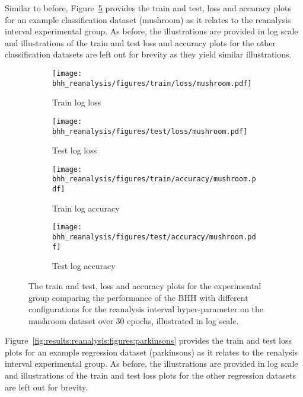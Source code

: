 Similar to before, Figure~\ref{fig:results:reanalysis:figures:mushroom} provides the train and test, loss and accuracy plots for an example classification dataset (mushroom) as it relates to the reanalysis interval experimental group. As before, the illustrations are provided in log scale and illustrations of the train and test loss and accuracy plots for the other classification datasets are left out for brevity as they yield similar illustrations.

\begin{figure}[htbp]
      \begin{subfigure}{0.5\textwidth}
            \centering
            \texttt{[image: bhh\_reanalysis/figures/train/loss/mushroom.pdf]}
            \caption{Train log loss}
            \label{fig:results:reanalysis:figures:loss:train:mushroom}
      \end{subfigure}
      \begin{subfigure}{0.5\textwidth}
            \centering
            \texttt{[image: bhh\_reanalysis/figures/test/loss/mushroom.pdf]}
            \caption{Test log loss}
            \label{fig:results:reanalysis:figures:loss:test:mushroom}
      \end{subfigure}
      \par\bigskip
      \begin{subfigure}{0.5\textwidth}
            \centering
            \texttt{[image: bhh\_reanalysis/figures/train/accuracy/mushroom.pdf]}
            \caption{Train log accuracy}
            \label{fig:results:reanalysis:figures:accuracy:train:mushroom}
      \end{subfigure}
      \begin{subfigure}{0.5\textwidth}
            \centering
            \texttt{[image: bhh\_reanalysis/figures/test/accuracy/mushroom.pdf]}
            \caption{Test log accuracy}
            \label{fig:results:reanalysis:figures:accuracy:test:mushroom}
      \end{subfigure}
      \par\bigskip
      \caption{The train and test, loss and accuracy plots for the experimental group comparing the performance of the \acs{BHH} with different configurations for the reanalysis interval hyper-parameter on the mushroom dataset over 30 epochs, illustrated in log scale.}
      \label{fig:results:reanalysis:figures:mushroom}
\end{figure}

Figure~\ref{fig:results:reanalysis:figures:parkinsons} provides the train and test loss plots for an example regression dataset (parkinsons) as it relates to the renalysis interval experimental group. As before, the illustrations are provided in log scale and illustrations of the train and test loss plots for the other regression datasets are left out for brevity.

